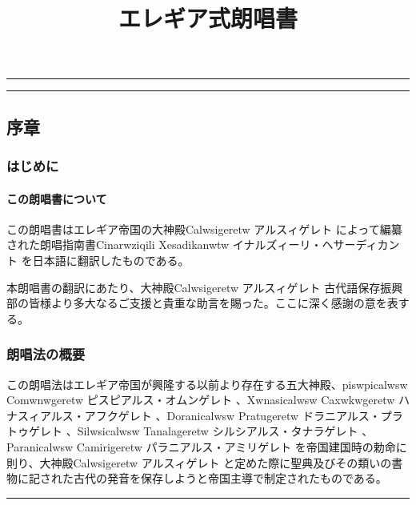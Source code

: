 \documentclass[
  japanese,
]{article}
\title{エレギア式朗唱書}
\author{}
\date{}
\begin{document}
\maketitle

{
\setcounter{tocdepth}{3}
\tableofcontents
}
\begin{center}\rule{0.5\linewidth}{0.5pt}\end{center}

\begin{center}\rule{0.5\linewidth}{0.5pt}\end{center}

\subsection{序章}\label{chapter1}

\subsubsection{はじめに}\label{section1.1}

\paragraph{この朗唱書について}\label{subsection1.1.1}

この朗唱書はエレギア帝国の大神殿{Calwsigeretw} アルスィゲレト
によって編纂された朗唱指南書{Cinarwziqili Xesadikanwtw}
イナルズィーリ・ヘサーディカント を日本語に翻訳したものである。

本朗唱書の翻訳にあたり、大神殿{Calwsigeretw} アルスィゲレト
古代語保存振興部の皆様より多大なるご支援と貴重な助言を賜った。ここに深く感謝の意を表する。

\subsubsection{朗唱法の概要}\label{section1.2}

この朗唱法はエレギア帝国が興隆する以前より存在する五大神殿、{piswpicalwsw
Comwnwgeretw} ピスピアルス・オムンゲレト 、{Xwnasicalwsw Caxwkwgeretw}
ハナスィアルス・アフクゲレト 、{Doranicalwsw Pratugeretw}
ドラニアルス・プラトゥゲレト 、{Silwsicalwsw Tanalageretw}
シルシアルス・タナラゲレト 、{Paranicalwsw Camirigeretw}
パラニアルス・アミリゲレト
を帝国建国時の勅命に則り、大神殿{Calwsigeretw} アルスィゲレト
と定めた際に聖典及びその類いの書物に記された古代の発音を保存しようと帝国主導で制定されたものである。

\begin{center}\rule{0.5\linewidth}{0.5pt}\end{center}
\end{document}
